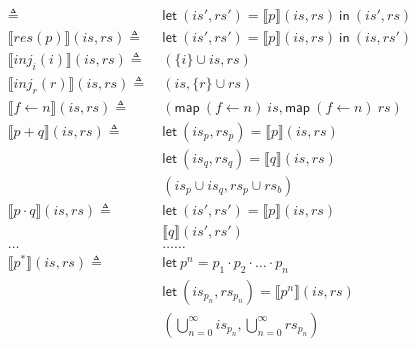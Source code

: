 \documentclass[12pt, letterpaper]{article}
\begin{document}
\begin{align*}
            \triangleq\ &
            \mathsf{let}\ (\mathit{is}',\mathit{rs}')
            = \llbracket p\rrbracket(\mathit{is}, \mathit{rs})\ 
            \mathsf{in}\ (\mathit{is}',\mathit{rs}) 
            \\
        \llbracket res(p) \rrbracket(\mathit{is}, \mathit{rs})
            \triangleq\ &
            \mathsf{let}\ (\mathit{is}',\mathit{rs}')
            = \llbracket p\rrbracket(\mathit{is}, \mathit{rs})\ 
            \mathsf{in}\ (\mathit{is},\mathit{rs}')
            \\
        \llbracket inj_{i}(i) \rrbracket(\mathit{is}, \mathit{rs})
            \triangleq\ &
            (\{i\} \cup \mathit{is}, \mathit{rs})
            \\
        \llbracket inj_{r}(r) \rrbracket(\mathit{is}, \mathit{rs})
            \triangleq\ &
            (\mathit{is}, \{r\} \cup \mathit{rs})
            \\
        \llbracket f \leftarrow n \rrbracket(\mathit{is}, \mathit{rs})
            \triangleq\ &
            (\mathsf{map}\ (f\leftarrow n)\ \mathit{is},
             \mathsf{map}\ (f\leftarrow n)\ \mathit{rs})
            \\
         \llbracket p + q \rrbracket(\mathit{is}, \mathit{rs})
            \triangleq\ &
            \mathsf{let}\ (\mathit{is}_p,\mathit{rs}_p) =
            \llbracket p \rrbracket(\mathit{is}, \mathit{rs}) 
            \\
            &\mathsf{let}\ (\mathit{is}_q,\mathit{rs}_q) =
            \llbracket q \rrbracket(\mathit{is}, \mathit{rs}) 
            \\
            &(\mathit{is}_p \cup \mathit{is}_q,\mathit{rs}_p \cup \mathit{rs}_b) 
            \\
        \llbracket p \cdot q \rrbracket(\mathit{is}, \mathit{rs})
            \triangleq\ &
            \mathsf{let}\ (\mathit{is}',\mathit{rs}') =
            \llbracket p \rrbracket(\mathit{is}, \mathit{rs})
            \\
            &\llbracket q \rrbracket(\mathit{is}', \mathit{rs}')
            \\
        \dots & \dots \dots \\
        \llbracket p ^{*} \rrbracket (\mathit{is}, \mathit{rs})
            \triangleq\ &
            \mathsf{let}\ p^{n} = p_{1} \cdot p_{2} \cdot \ldots \cdot p_{n}
            \\
            &\mathsf{let}\ (\mathit{is_{p_{n}}}, \mathit{rs_{p_{n}}}) = \llbracket p^{n} \rrbracket (is, rs)
            \\
            &(\bigcup^{\infty}_{n=0} \mathit{is_{p_{n}}}, \bigcup^{\infty}_{n=0} \mathit{rs_{p_{n}}})
            \\
    \end{align*}
\end{document}
